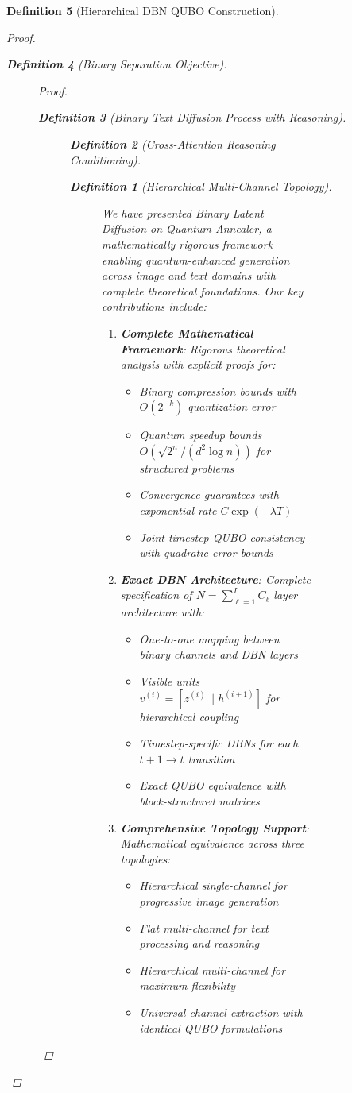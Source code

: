 \documentclass{article}
\newtheorem{definition}{Definition}
\begin{document}
\begin{definition}[Hierarchical DBN QUBO Construction]
\begin{proof}
\begin{definition}[Binary Separation Objective]
\begin{figure}[H]
\begin{proof}
\begin{definition}[Binary Text Diffusion Process with Reasoning]
\begin{figure}[H]
\begin{definition}[Cross-Attention Reasoning Conditioning]
\begin{definition}[Hierarchical Multi-Channel Topology]
\begin{figure}[H]
We have presented Binary Latent Diffusion on Quantum Annealer, a mathematically rigorous framework enabling quantum-enhanced generation across image and text domains with complete theoretical foundations. Our key contributions include:

\begin{enumerate}
\item \textbf{Complete Mathematical Framework}: Rigorous theoretical analysis with explicit proofs for:
\begin{itemize}
\item Binary compression bounds with $O(2^{-k})$ quantization error
\item Quantum speedup bounds $O(\sqrt{2^n}/(d^2 \log n))$ for structured problems
\item Convergence guarantees with exponential rate $C \exp(-\lambda T)$
\item Joint timestep QUBO consistency with quadratic error bounds
\end{itemize}

\item \textbf{Exact DBN Architecture}: Complete specification of $N = \sum_{\ell=1}^L C_\ell$ layer architecture with:
\begin{itemize}
\item One-to-one mapping between binary channels and DBN layers
\item Visible units $v^{(i)} = [z^{(i)} \| h^{(i+1)}]$ for hierarchical coupling
\item Timestep-specific DBNs for each $t+1 \rightarrow t$ transition
\item Exact QUBO equivalence with block-structured matrices
\end{itemize}

\item \textbf{Comprehensive Topology Support}: Mathematical equivalence across three topologies:
\begin{itemize}
\item Hierarchical single-channel for progressive image generation
\item Flat multi-channel for text processing and reasoning
\item Hierarchical multi-channel for maximum flexibility
\item Universal channel extraction with identical QUBO formulations
\end{itemize}


\end{enumerate}
\end{figure}
\end{definition}
\end{definition}
\end{figure}
\end{definition}
\end{proof}
\end{figure}
\end{definition}
\end{proof}
\end{definition}
\end{document}
